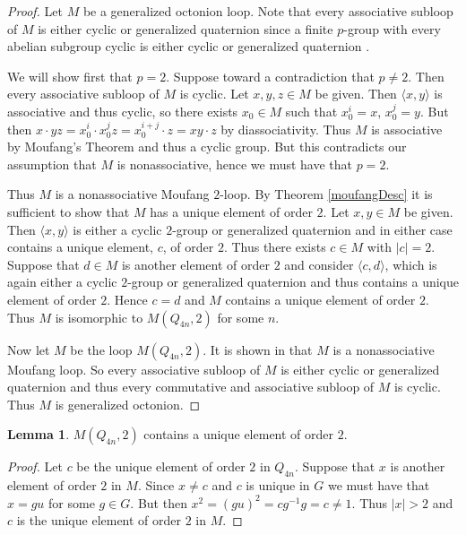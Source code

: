 \documentclass[12pt]{report}
\theoremstyle{definition}
\newtheorem{lem}[thm]{Lemma}
\begin{document}
\begin{proof}
	Let $M$ be a generalized octonion loop. Note that every associative subloop of $M$ is either cyclic or
    generalized quaternion since a finite $p$-group with every abelian subgroup cyclic is either cyclic or
    generalized quaternion \cite{Cartan}.

	We will show first that $p = 2$. Suppose toward a contradiction that $p\neq 2$. Then every associative
    subloop of $M$ is cyclic. Let $x, y, z\in M$ be given. Then $\langle x, y\rangle$ is associative and
    thus cyclic, so there exists $x_0\in M$ such that $x_0^i = x$, $x_0^j = y$. But then
    $x\cdot yz = x_0^i\cdot x_0^jz = x_0^{i + j}\cdot z = xy\cdot z$ by diassociativity. Thus $M$ is
    associative by Moufang's Theorem and thus a cyclic group. But this contradicts our assumption that
    $M$ is nonassociative, hence we must have that $p = 2$.

	Thus $M$ is a nonassociative Moufang $2$-loop. By Theorem \ref{moufangDesc} it is sufficient to show
    that $M$ has a unique element of order $2$. Let $x, y\in M$ be given. Then $\langle x, y\rangle$ is
    either a cyclic $2$-group or generalized quaternion and in either case contains a unique element,
    $c$, of order $2$. Thus there exists $c\in M$ with $|c| = 2$. Suppose that $d\in M$ is another
    element of order $2$ and consider $\langle c, d\rangle$, which is again either a cyclic $2$-group or
    generalized quaternion and thus contains a unique element of order $2$. Hence $c = d$ and $M$ contains
    a unique element of order $2$. Thus $M$ is isomorphic to $M(Q_{4n}, 2)$ for some $n$.

  Now let $M$ be the loop $M(Q_{4n}, 2)$. It is shown in \cite{Chein} that $M$ is a nonassociative Moufang
    loop. So every associative subloop of $M$ is either cyclic or generalized quaternion and thus every
    commutative and associative subloop of $M$ is cyclic. Thus $M$ is generalized octonion.
\end{proof}

\begin{lem}
  $M(Q_{4n}, 2)$ contains a unique element of order $2$.
\end{lem}

\begin{proof}
  Let $c$ be the unique element of order $2$ in $Q_{4n}$. Suppose that $x$ is another element of
    order $2$ in $M$. Since $x\neq c$ and $c$ is unique in $G$ we must have that $x = gu$ for some
    $g\in G$. But then $x^2 = (gu)^2 = c g^{-1}g = c\neq 1$. Thus $|x| > 2$ and $c$ is the unique
    element of order $2$ in $M$.
\end{proof}
\end{document}
